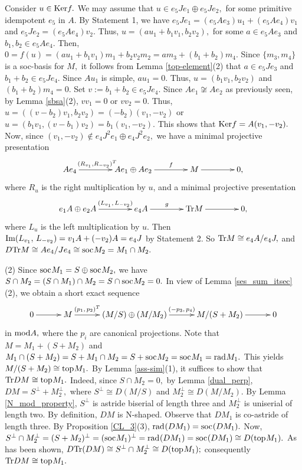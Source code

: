 \documentclass[10pt]{amsart}
\theoremstyle{definition}
\newcommand{\mmod}{{\rm mod}}
\newcommand{\rad}{{\rm rad}\hspace{.5pt}}
\newcommand{\soc}{{\rm soc}\hspace{.5pt}}
\newcommand{\ntop}{{\rm top}\hspace{.5pt}}
\newcommand{\Ker}{{\rm Ker}}
\newcommand{\vp}{\vspace{.5pt}}
\begin{document}
Consider $u\in \Ker f.$ We may assume that $u\in e_5Je_1\oplus e_5Je_2,$ for some primitive idempotent $e_5$ in $A$. By Statement 1, we have $e_5Je_1=(e_5Ae_3)u_1+(e_5Ae_4)v_1$ and $e_5Je_2=(e_5Ae_4)v_2.$ Thus, $u=(a u_1 + b_1 v_1, b_2v_2),$ for some $a\in e_5Ae_3$ and $b_1, b_2\in e_5Ae_4.$ Then, $0=f(u)=(au_1+b_1v_1) m_1 + b_2v_2 m_2 = am_3+(b_1+b_2)m_4.$
Since $\{m_3, m_4\}$ is a soc-basis for $M,$ it follows from Lemma \ref{top-element}(2) that $a\in e_5Je_3$ and $b_1+b_2\in e_5Je_4.$ Since $Au_1$ is simple, $au_1=0$. Thus, $u=(b_1v_1, b_2v_2)$ and $(b_1+b_2)m_4=0.$ Set $v:=b_1+b_2\in e_5Je_4.$ Since $Ae_1\not\cong Ae_2$ as previously seen, by Lemma \ref{sbsa}(2), $vv_1=0$ or $vv_2=0$. Thus,
$u=((v-b_2)v_1, b_2v_2)=(-b_2)(v_1, -v_2)$ or $u=(b_1v_1, (v-b_1)v_2)=b_1(v_1, -v_2)$. This shows that $\Ker f=A(v_1, -v_2).$ 
Now, since $(v_1, -v_2)\notin e_4J^2e_1\oplus e_4J^2e_2,$
we have a minimal projective presentation \vspace{-5pt}
$$\xymatrixcolsep{40pt}\xymatrix{Ae_4\ar[r]^-{\hspace{4pt}(R_{v_1}, R_{-v_2})^T} & Ae_1\oplus Ae_2 \ar[r]^-f & M\ar[r] & 0,}\vspace{-3.5pt}$$ where $R_{u}$ is the right multiplication by $u$, and a minimal projective presentation \vspace{-5pt}
$$\xymatrixcolsep{40pt}\xymatrix{e_1A\oplus e_2A\ar[r]^-{(L_{v_1}, \, L_{-v_2})} & e_4A \ar[r]^-g & {\rm Tr} M\ar[r] & 0,}\vspace{-3pt}$$ where $L_{u}$ is the left multiplication by $u$. Then ${\rm Im}(L_{v_1}, \, L_{-v_2})=v_1A+(-v_2)A=e_4J$ by Statement 2. So ${\rm Tr}M \cong e_4A/e_4J,$ and  
$D{\rm Tr}M\cong Ae_4/Je_4\cong \soc M_2=M_1\cap M_2.$ 

\vp

(2) Since $\soc M_1= S \oplus \soc M_2,$ we have $S\cap M_2= (S\cap M_1)\cap M_2=S\cap \soc M_2=0.$ In view of Lemma \ref{ses_sum_itsec}(2), we obtain a short exact sequence \vspace{-5.5pt}
$$\xymatrixcolsep{30pt}\xymatrix{0\ar[r] & M \ar[r]^-{(p_1, \,p_2)^T} & (M / S) \oplus (M/M_2)\ar[r]^-{(-p_3, \,p_4)} & M/ (S + M_2) \ar[r] & 0} \vspace{-4.5pt}$$ in $\mmod A,$ where the $p_i$ are canonical projections. Note that $M=M_1+(S+M_2)$ and $M_1\cap (S+M_2)=S+M_1\cap M_2=S+\soc M_2=\soc M_1=\rad M_1.$ This yields $M/(S+M_2)\cong \ntop M_1.$ By Lemma \ref{ass-sim}(1), it suffices to show that ${\rm Tr}D M\cong \ntop M_1.$ Indeed, since $S\cap M_2=0,$ by Lemma \ref{dual_perp}, $DM=S^\perp+M_2^\perp,$ where $S^\perp \cong D(M/S)$ and $M_2^\perp\cong D(M/M_2).$ By Lemma \ref{N_mod_property}, $S^\perp$ is astride biserial of length three and $M_2^\perp$ is uniserial of length two. By definition, $DM$ is N-shaped. Observe that $DM_1$ is co-astride of length three. By Proposition \ref{CL_3}(3), $\rad(DM_1)= \soc(DM_1).$ Now, 
$S^\perp \cap M_2^\perp=(S+M_2)^\perp=(\soc M_1)^\perp=\rad(DM_1)= \soc(DM_1)\cong D(\ntop M_1).$ As has been shown, $D{\rm Tr}(DM) \cong S^\perp \cap M_2^\perp\cong D(\ntop M_1);$ consequently  ${\rm Tr}D M \cong \ntop M_1.$ 
\end{document}
